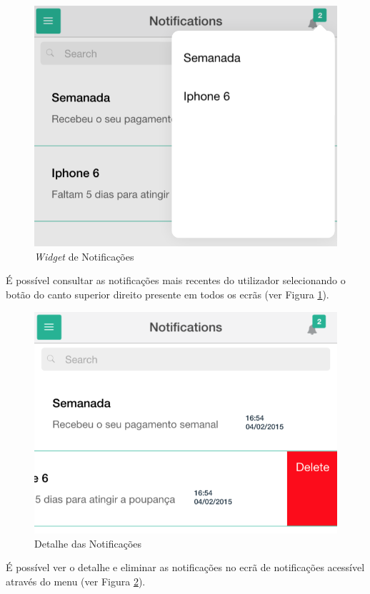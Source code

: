 \begin{figure}[H]
	\begin{center}
		\includegraphics[width=0.5
		\textwidth]{notifications/notifications_widget.png}
	\end{center}
	\caption{\textit{Widget} de Notificações}
	\label{fig:6}
\end{figure}

É possível consultar as notificações mais recentes do utilizador selecionando o botão do canto superior direito presente em todos os ecrãs (ver Figura \ref{fig:6}).

\begin{figure}[H]
	\begin{center}
		\includegraphics[width=0.5
		\textwidth]{notifications/notifications.png}
	\end{center}
	\caption{Detalhe das Notificações}
	\label{fig:6_1}
\end{figure}

É possível ver o detalhe e eliminar as notificações no ecrã de notificações acessível através do menu (ver Figura \ref{fig:6_1}).
